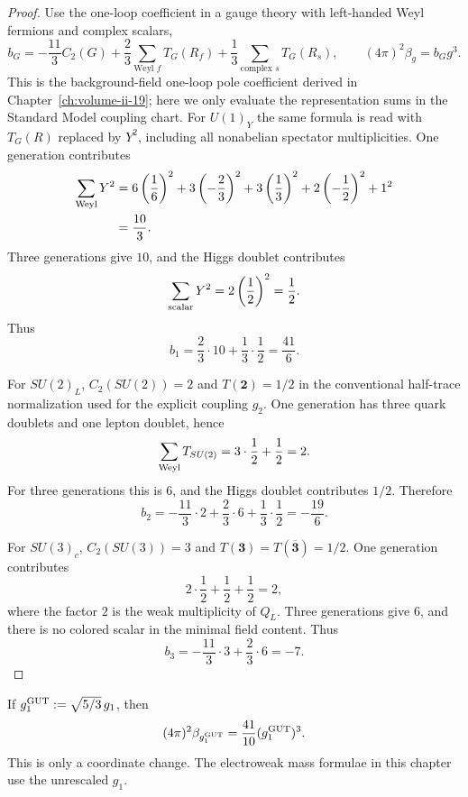 \begin{proof}
Use the one-loop coefficient in a gauge theory with left-handed Weyl
fermions and complex scalars,
\begin{equation}
  b_G=-\frac{11}{3}C_2(G)
      +\frac{2}{3}\sum_{\text{Weyl }f}T_G(R_f)
      +\frac{1}{3}\sum_{\text{complex }s}T_G(R_s),
  \qquad
  (4\pi)^2\beta_g=b_Gg^3 .
  \label{eq:sm-one-loop-general-gauge-beta}
\end{equation}
This is the background-field one-loop pole coefficient derived in
Chapter~\ref{ch:volume-ii-19}; here we only evaluate the representation
sums in the Standard Model coupling chart.  For \(U(1)_Y\) the same formula is
read with \(T_G(R)\) replaced by \(Y^2\), including all nonabelian spectator
multiplicities.  One generation contributes
\[
\begin{aligned}
  \sum_{\rm Weyl}Y^2
  &=
  6\left(\frac{1}{6}\right)^2
  +3\left(-\frac{2}{3}\right)^2
  +3\left(\frac{1}{3}\right)^2
  +2\left(-\frac{1}{2}\right)^2
  +1^2\\
  &=\frac{10}{3}.
\end{aligned}
\]
Three generations give \(10\), and the Higgs doublet contributes
\[
  \sum_{\rm scalar}Y^2=2\left(\frac{1}{2}\right)^2=\frac{1}{2}.
\]
Thus
\[
  b_1=\frac{2}{3}\cdot10+\frac{1}{3}\cdot\frac{1}{2}
  =\frac{41}{6}.
\]

For \(SU(2)_L\), \(C_2(SU(2))=2\) and \(T(\mathbf2)=1/2\) in the conventional
half-trace normalization used for the explicit coupling \(g_2\).  One
generation has three quark doublets and one lepton doublet, hence
\[
  \sum_{\rm Weyl}T_{SU(2)}=3\cdot\frac{1}{2}+\frac{1}{2}=2 .
\]
For three generations this is \(6\), and the Higgs doublet contributes
\(1/2\).  Therefore
\[
  b_2=-\frac{11}{3}\cdot2+\frac{2}{3}\cdot6+\frac{1}{3}\cdot\frac{1}{2}
  =-\frac{19}{6}.
\]

For \(SU(3)_c\), \(C_2(SU(3))=3\) and \(T(\mathbf3)=T(\overline{\mathbf3})=1/2\).
One generation contributes
\[
  2\cdot\frac{1}{2}+\frac{1}{2}+\frac{1}{2}=2,
\]
where the factor \(2\) is the weak multiplicity of \(Q_L\).  Three
generations give \(6\), and there is no colored scalar in the minimal field
content.
Thus
\[
  b_3=-\frac{11}{3}\cdot3+\frac{2}{3}\cdot6=-7 .
\]
\end{proof}

\begin{remark}
If \(g_1^{\rm GUT}:=\sqrt{5/3}\,g_1\), then
\[
  (4\pi)^2\beta_{g_1^{\rm GUT}}
  =
  \frac{41}{10}(g_1^{\rm GUT})^3 .
\]
This is only a coordinate change.  The electroweak mass formulae in this
chapter use the unrescaled \(g_1\).
\end{remark}

